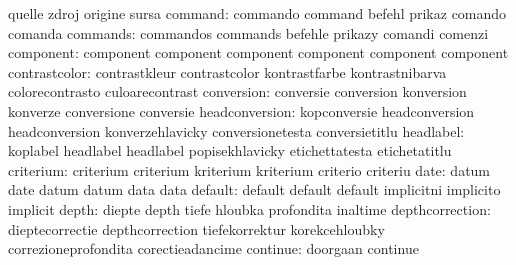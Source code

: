                            quelle                    zdroj
                           origine                   sursa
                  command: commando                  command
                           befehl                    prikaz
                           comando                   comanda
                 commands: commandos                 commands
                           befehle                   prikazy
                           comandi                   comenzi
component: component                 component
           component                 component
           component                 component
            contrastcolor: contrastkleur             contrastcolor
                           kontrastfarbe             kontrastnibarva
                           colorecontrasto           culoarecontrast
               conversion: conversie                 conversion
                           konversion                konverze
                           conversione               conversie
           headconversion: kopconversie              headconversion
                           headconversion            konverzehlavicky
                           conversionetesta          conversietitlu %
                headlabel: koplabel                  headlabel
                           headlabel                 popisekhlavicky
                           etichettatesta            etichetatitlu %
                criterium: criterium                 criterium
                           kriterium                 kriterium
                           criterio                  criteriu
                     date: datum                     date
                           datum                     datum
                           data                      data
                  default: default                   default
                           default                   implicitni
                           implicito                 implicit
                    depth: diepte                    depth
                           tiefe                     hloubka
                           profondita                inaltime
          depthcorrection: dieptecorrectie           depthcorrection
                           tiefekorrektur            korekcehloubky
                           correzioneprofondita      corectieadancime
                 continue: doorgaan                  continue
